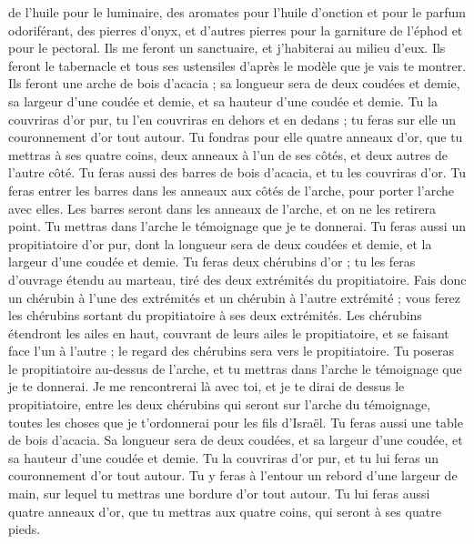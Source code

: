 \begin{multicols}{2}
de l'huile pour le luminaire, des aromates pour l'huile d'onction et pour le parfum odoriférant,
des pierres d'onyx, et d’autres pierres pour la garniture de l'éphod et pour le pectoral.
Ils me feront un sanctuaire, et j'habiterai au milieu d'eux.
Ils feront le tabernacle et tous ses ustensiles d’après le modèle que je vais te montrer.
Ils feront une arche de bois d’acacia ; sa longueur sera de deux coudées et demie, sa largeur d'une coudée et demie, et sa hauteur d'une coudée et demie.
Tu la couvriras d’or pur, tu l'en couvriras en dehors et en dedans ; tu feras sur elle un couronnement d'or tout autour.
Tu fondras pour elle quatre anneaux d'or, que tu mettras à ses quatre coins, deux anneaux à l'un de ses côtés, et deux autres de l'autre côté.
Tu feras aussi des barres de bois d’acacia, et tu les couvriras d'or.
Tu feras entrer les barres dans les anneaux aux côtés de l'arche, pour porter l'arche avec elles.
Les barres seront dans les anneaux de l'arche, et on ne les retirera point.
Tu mettras dans l'arche le témoignage que je te donnerai.
Tu feras aussi un propitiatoire d’or pur, dont la longueur sera de deux coudées et demie, et la largeur d'une coudée et demie.
Tu feras deux chérubins d'or ; tu les feras d'ouvrage étendu au marteau, tiré des deux extrémités du propitiatoire.
Fais donc un chérubin à l'une des extrémités et un chérubin à l'autre extrémité ; vous ferez les chérubins sortant du propitiatoire à ses deux extrémités.
Les chérubins étendront les ailes en haut, couvrant de leurs ailes le propitiatoire, et se faisant face l’un à l’autre ; le regard des chérubins sera vers le propitiatoire.
Tu poseras le propitiatoire au-dessus de l'arche, et tu mettras dans l'arche le témoignage que je te donnerai.
Je me rencontrerai là avec toi, et je te dirai de dessus le propitiatoire, entre les deux chérubins qui seront sur l'arche du témoignage, toutes les choses que je t’ordonnerai pour les fils d'Israël.
Tu feras aussi une table de bois d’acacia. Sa longueur sera de deux coudées, et sa largeur d'une coudée, et sa hauteur d'une coudée et demie.
Tu la couvriras d’or pur, et tu lui feras un couronnement d'or tout autour.
Tu y feras à l’entour un rebord d’une largeur de main, sur lequel tu mettras une bordure d’or tout autour.
Tu lui feras aussi quatre anneaux d'or, que tu mettras aux quatre coins, qui seront à ses quatre pieds.

\end{multicols}
